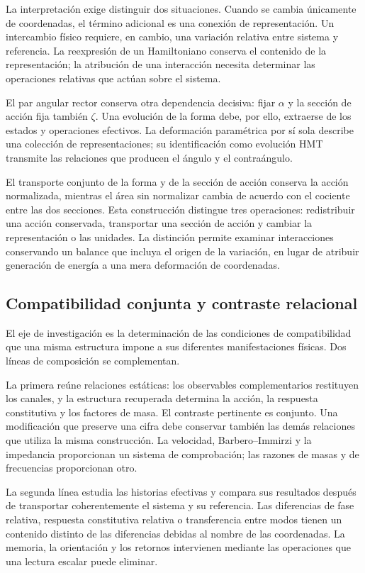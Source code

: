 La interpretación exige distinguir dos situaciones. Cuando se cambia
únicamente de coordenadas, el término adicional es una conexión de
representación. Un intercambio físico requiere, en cambio, una variación
relativa entre sistema y referencia. La reexpresión de un Hamiltoniano
conserva el contenido de la representación; la atribución de una interacción
necesita determinar las operaciones relativas que actúan sobre el sistema.

El par angular rector conserva otra dependencia decisiva: fijar $\alpha$
y la sección de acción fija también $\zeta$. Una evolución de la forma
debe, por ello, extraerse de los estados y operaciones efectivos. La
deformación paramétrica por sí sola describe una colección de representaciones;
su identificación como evolución HMT transmite las relaciones que producen
el ángulo y el contraángulo.

El transporte conjunto de la forma y de la sección de acción conserva la
acción normalizada, mientras el área sin normalizar cambia de acuerdo con
el cociente entre las dos secciones. Esta construcción distingue tres
operaciones: redistribuir una acción conservada, transportar una sección de
acción y cambiar la representación o las unidades. La distinción permite
examinar interacciones conservando un balance que incluya el origen de la
variación, en lugar de atribuir generación de energía a una mera deformación
de coordenadas.

\subsection{Compatibilidad conjunta y contraste relacional}
\label{subsec:narrativa-compatibilidad-conjunta}

El eje de investigación es la determinación de las condiciones de
compatibilidad que una misma estructura impone a sus diferentes
manifestaciones físicas. Dos líneas de composición se complementan.

La primera reúne relaciones estáticas: los observables complementarios
restituyen los canales, y la estructura recuperada determina la acción,
la respuesta constitutiva y los factores de masa. El contraste pertinente
es conjunto. Una modificación que preserve una cifra debe conservar también
las demás relaciones que utiliza la misma construcción. La velocidad,
Barbero--Immirzi y la impedancia proporcionan un sistema de comprobación;
las razones de masas y de frecuencias proporcionan otro.

La segunda línea estudia las historias efectivas y compara sus resultados
después de transportar coherentemente el sistema y su referencia. Las
diferencias de fase relativa, respuesta constitutiva relativa o transferencia
entre modos tienen un contenido distinto de las diferencias debidas al
nombre de las coordenadas. La memoria, la orientación y los retornos
intervienen mediante las operaciones que una lectura escalar puede eliminar.


